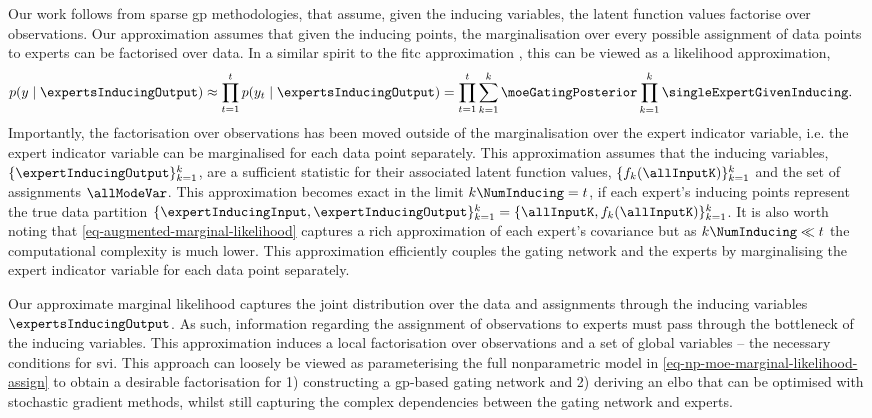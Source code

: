 \documentclass{mimosis-class/mimosis}
\numberwithin{equation}{chapter}
\newcommand{\numData}{\ensuremath{t}}
\newcommand{\modeInd}{\ensuremath{k}}
\newcommand{\NumData}{\ensuremath{\MakeUppercase{\numData}}}
\newcommand{\ModeInd}{\ensuremath{\MakeUppercase{\modeInd}}}
\newcommand{\singleData}[1]{\ensuremath{#1_{\numData}}}
\newcommand{\allData}[1]{\ensuremath{\MakeUppercase{#1}}}
\newcommand{\mode}[1]{\ensuremath{#1_{\modeInd}}}
\newcommand{\y}{\ensuremath{y}}
\newcommand{\singleOutput}{\ensuremath{\singleData{\y}}}
\newcommand{\allOutput}{\ensuremath{\allData{\y}}}
\newcommand{\latentFunc}{\ensuremath{f}}
\begin{document}
{Our work follows from sparse \acrshort{gp} methodologies, that assume,
given the inducing variables, the latent function values factorise over observations.
Our approximation assumes that given the inducing points,
the marginalisation over every possible assignment of data points to experts can be factorised over data.
In a similar spirit to the \acrfull{fitc} approximation \citep{naish-guzmanGeneralized2008,quinonero-candelaUnifying2005},
this can be viewed as a likelihood approximation,
\begin{align} \label{eq-likelihood-approximation}
p(\allOutput \mid \expertsInducingOutput)
&\approx \prod_{\numData=1}^{\NumData} p(\singleOutput \mid \expertsInducingOutput)
= \prod_{\numData=1}^{\NumData} \sum_{\modeInd=1}^{\ModeInd} \moeGatingPosterior
\prod_{\modeInd=1}^{\ModeInd} \singleExpertGivenInducing.
\end{align}
Importantly, the factorisation over observations has been moved
outside of the marginalisation over the expert indicator variable, i.e.
the expert indicator variable can be marginalised for each data point separately.
This approximation assumes that the inducing variables,
\(\{\expertInducingOutput\}_{\modeInd=1}^\ModeInd\), are
a sufficient statistic for their associated latent function values,
\(\{\mode{\latentFunc}(\allInputK) \}_{\modeInd=1}^\ModeInd\)
and the set of assignments \(\allModeVar\).
This approximation becomes exact in the limit \(\ModeInd\NumInducing=\NumData\),
if each expert's inducing points represent the true data partition
\(\{\expertInducingInput, \expertInducingOutput\}_{\modeInd=1}^{\ModeInd} = \{\allInputK, \mode{\latentFunc}(\allInputK)\}_{\modeInd=1}^{\ModeInd}\).
It is also worth noting that \cref{eq-augmented-marginal-likelihood} captures a rich approximation of each
expert's covariance but as \(\ModeInd\NumInducing \ll \NumData\) the computational complexity is
much lower.
This approximation efficiently couples the gating network and the experts by marginalising the expert
indicator variable for each data point separately.

Our approximate marginal likelihood captures
the joint distribution over the data and assignments through the inducing variables
\(\expertsInducingOutput\).
As such, information regarding the assignment of observations to experts must pass through the bottleneck of the
inducing variables.
This approximation induces a local factorisation over observations and a set of global variables
-- the necessary conditions for \acrshort{svi}.
This approach can loosely be viewed as parameterising the full nonparametric model
in \cref{eq-np-moe-marginal-likelihood-assign} to obtain a desirable
factorisation for 1) constructing a \acrshort{gp}-based gating network and 2) deriving an \acrshort{elbo} that can
be optimised with stochastic gradient methods,
whilst still capturing the complex dependencies between the gating network and experts.
}
\end{document}
